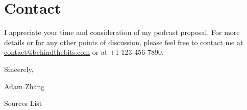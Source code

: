 \documentclass[12pt]{article}
\begin{document}
\section*{Contact}
I appreciate your time and consideration of my podcast proposal. For more
details or for any other points of discussion, please feel free to contact me at
\href{mailto:contact@behindthebits.com}{contact@behindthebits.com} or at +1 123-456-7890.

\bigskip
\hfill\begin{minipage}{0.25\textwidth}
  \raggedright
  Sincerely,
  
  \bigskip Adam Zhang
\end{minipage}

\clearpage
\begin{center}
  Sources List
\end{center}
\printbibliography[title={\relax}]
\end{document}
